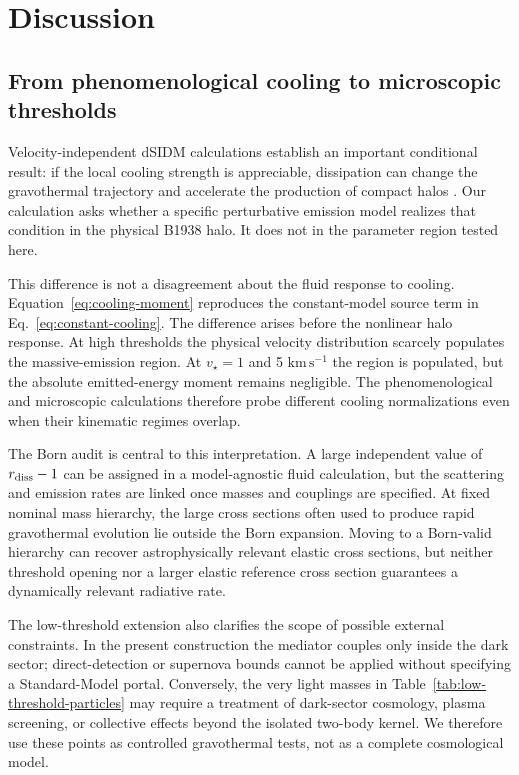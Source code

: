 \documentclass[12pt]{article}
\newcommand{\vstar}{v_\star}
\begin{document}
\section{Discussion}
\label{sec:discussion}

\subsection{From phenomenological cooling to microscopic thresholds}

Velocity-independent dSIDM calculations establish an important conditional
result: if the local cooling strength is appreciable, dissipation can change
the gravothermal trajectory and accelerate the production of compact halos
\citep{Schmidt2026}.  Our calculation asks whether a specific perturbative
emission model realizes that condition in the physical B1938 halo.  It does
not in the parameter region tested here.

This difference is not a disagreement about the fluid response to cooling.
Equation~\eqref{eq:cooling-moment} reproduces the constant-model source term in
Eq.~\eqref{eq:constant-cooling}.  The difference arises before the nonlinear
halo response.  At high thresholds the physical velocity distribution scarcely
populates the massive-emission region.  At $\vstar=1$ and 5
$\mathrm{km\,s^{-1}}$ the region is populated, but the absolute emitted-energy
moment remains negligible.  The phenomenological and microscopic calculations
therefore probe different cooling normalizations even when their kinematic
regimes overlap.

The Born audit is central to this interpretation.  A large independent value
of $r_{\rm diss}-1$ can be assigned in a model-agnostic fluid calculation, but
the scattering and emission rates are linked once masses and couplings are
specified.  At fixed nominal mass hierarchy, the large cross sections often
used to produce rapid gravothermal evolution lie outside the Born expansion.
Moving to a Born-valid hierarchy can recover astrophysically relevant elastic
cross sections, but neither threshold opening nor a larger elastic reference
cross section guarantees a dynamically relevant radiative rate.

The low-threshold extension also clarifies the scope of possible external
constraints.  In the present construction the mediator couples only inside
the dark sector; direct-detection or supernova bounds cannot be applied without
specifying a Standard-Model portal.  Conversely, the very light masses in
Table~\ref{tab:low-threshold-particles} may require a treatment of dark-sector
cosmology, plasma screening, or collective effects beyond the isolated
two-body kernel.  We therefore use these points as controlled gravothermal
tests, not as a complete cosmological model.
\end{document}
